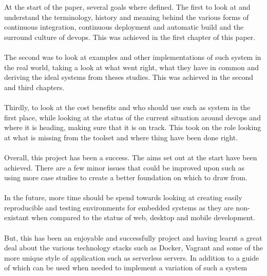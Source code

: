 At the start of the paper, several goals where defined. The first to look at and understand the terminology, history and meaning behind the various forms of continuous integration, continuous deployment and automatic build and the surround culture of devops. This was achieved in the first chapter of this paper.
\\\\
The second was to look at examples and other implementations of such system in the real world, taking a look at what went right, what they have in common and deriving the ideal systems from theses studies. This was achieved in the second and third chapters.
\\\\
Thirdly, to look at the cost benefits and who should use such as system in the first place, while looking at the status of the current situation around devops and where it is heading, making sure that it is on track. This took on the role looking at what is missing from the toolset and where thing have been done right.
\\\\
Overall, this project has been a success. The aims set out at the start have been achieved. There are a few minor issues that could be improved upon such as using more case studies to create a better foundation on which to draw from. 
\\\\
In the future, more time should be spend towards looking at creating easily reproducible and testing environments for embedded systems as they are non-existant when compared to the status of web, desktop and mobile development.
\\\\
But, this has been an enjoyable and successfully project and having learnt a great deal about the various technology stacks such as Docker, Vagrant and some of the more unique style of application such as serverless servers. In addition to a guide of which can be used when needed to implement a variation of  such a system